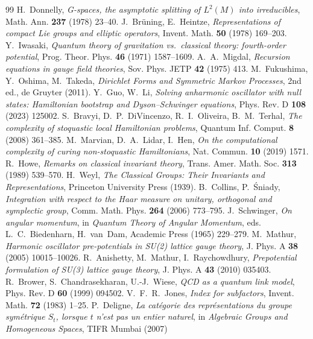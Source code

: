 \documentclass[11pt]{article}
\theoremstyle{definition}
\theoremstyle{remark}
\begin{document}
\begin{thebibliography}{99}
 H.~Donnelly, \emph{G-spaces, the asymptotic splitting
of $L^2(M)$ into irreducibles}, Math. Ann. \textbf{237} (1978) 23--40.
 J.~Br\"uning, E.~Heintze,
\emph{Representations of compact Lie groups and elliptic operators},
Invent. Math. \textbf{50} (1978) 169--203.
 Y.~Iwasaki, \emph{Quantum theory of gravitation vs.\
classical theory: fourth-order potential}, Prog. Theor. Phys.
\textbf{46} (1971) 1587--1609.
 A.~A.~Migdal, \emph{Recursion equations in gauge field
theories}, Sov. Phys. JETP \textbf{42} (1975) 413.
 M.~Fukushima, Y.~Oshima, M.~Takeda, \emph{Dirichlet Forms
and Symmetric Markov Processes}, 2nd ed., de Gruyter (2011).
 Y.~Guo, W.~Li, \emph{Solving anharmonic oscillator with
null states: Hamiltonian bootstrap and Dyson--Schwinger equations},
Phys. Rev. D \textbf{108} (2023) 125002.
 S.~Bravyi, D.~P.~DiVincenzo, R.~I.~Oliveira,
B.~M.~Terhal, \emph{The complexity of stoquastic local Hamiltonian
problems}, Quantum Inf. Comput. \textbf{8} (2008) 361--385.
 M.~Marvian, D.~A.~Lidar, I.~Hen, \emph{On the
computational complexity of curing non-stoquastic Hamiltonians}, Nat.
Commun. \textbf{10} (2019) 1571.
 R.~Howe, \emph{Remarks on classical invariant theory},
Trans. Amer. Math. Soc. \textbf{313} (1989) 539--570.
 H.~Weyl, \emph{The Classical Groups: Their Invariants
and Representations}, Princeton University Press (1939).
 B.~Collins, P.~\'Sniady, \emph{Integration with
respect to the Haar measure on unitary, orthogonal and symplectic
group}, Comm. Math. Phys. \textbf{264} (2006) 773--795.
 J.~Schwinger, \emph{On angular momentum}, in
\emph{Quantum Theory of Angular Momentum}, eds. L.~C.~Biedenharn,
H.~van~Dam, Academic Press (1965) 229--279.
 M.~Mathur, \emph{Harmonic oscillator pre-potentials in
SU(2) lattice gauge theory}, J. Phys. A \textbf{38} (2005)
10015--10026.
 R.~Anishetty, M.~Mathur, I.~Raychowdhury,
\emph{Prepotential formulation of SU(3) lattice gauge theory}, J. Phys.
A \textbf{43} (2010) 035403.
 R.~Brower, S.~Chandrasekharan, U.-J.~Wiese,
\emph{QCD as a quantum link model}, Phys. Rev. D \textbf{60} (1999)
094502.
 V.~F.~R.~Jones, \emph{Index for subfactors}, Invent.
Math. \textbf{72} (1983) 1--25.
 P.~Deligne, \emph{La cat\'egorie des repr\'esentations
du groupe sym\'etrique $S_t$, lorsque $t$ n'est pas un entier naturel},
in \emph{Algebraic Groups and Homogeneous Spaces}, TIFR Mumbai (2007)

\end{thebibliography}
\end{document}
